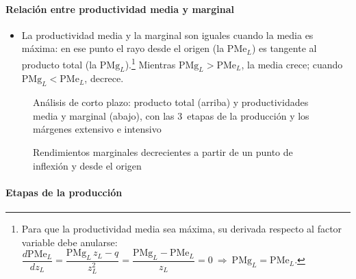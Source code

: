 \documentclass[11pt]{article}
\begin{document}
\paragraph{Relación entre productividad media y marginal}

\begin{itemize}
\item La productividad media y la marginal son iguales cuando la media es máxima: en ese punto el rayo desde el origen (la $\mathrm{PMe}_L$) es tangente al producto total (la $\mathrm{PMg}_L$).\footnote{Para que la productividad media sea máxima, su derivada respecto al factor variable debe anularse: $\dfrac{d\mathrm{PMe}_L}{dz_L}=\dfrac{\mathrm{PMg}_L\,z_L-q}{z_L^2}=\dfrac{\mathrm{PMg}_L-\mathrm{PMe}_L}{z_L}=0\ \Longrightarrow\ \mathrm{PMg}_L=\mathrm{PMe}_L$.\findemo} Mientras $\mathrm{PMg}_L>\mathrm{PMe}_L$, la media crece; cuando $\mathrm{PMg}_L<\mathrm{PMe}_L$, decrece.
\end{itemize}

\begin{figure}[H]
\centering
\caption{Análisis de corto plazo: producto total (arriba) y productividades media y marginal (abajo), con las 3~etapas de la producción y los márgenes extensivo e intensivo}\label{fig:corto-plazo}
\end{figure}

\begin{figure}[H]
\centering
\caption{Rendimientos marginales decrecientes a partir de un punto de inflexión y desde el origen}\label{fig:rendimientos-decrecientes-origen}
\end{figure}

\paragraph{Etapas de la producción}
\end{document}
